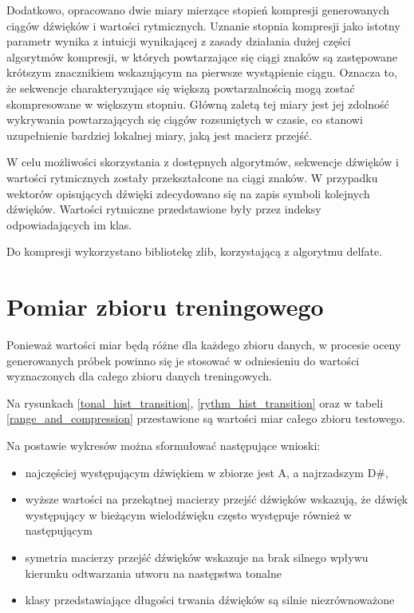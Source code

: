 {{        Dodatkowo, opracowano dwie miary mierzące stopień kompresji generowanych ciągów dźwięków i wartości rytmicznych. 
        Uznanie stopnia kompresji jako istotny parametr wynika z intuicji wynikającej z zasady działania dużej części
        algorytmów kompresji, w których powtarzające się ciągi znaków są zastępowane krótszym znacznikiem wskazującym na pierwsze 
        wystąpienie ciągu. 
        Oznacza to, że sekwencje charakteryzujące się większą powtarzalnością mogą zostać skompresowane w większym stopniu.
        Główną zaletą tej miary jest jej zdolność wykrywania powtarzających się ciągów rozsuniętych w czasie, co stanowi uzupełnienie 
        bardziej lokalnej miary, jaką jest macierz przejść.

        W celu możliwości skorzystania z dostępnych algorytmów, sekwencje dźwięków i wartości rytmicznych zostały przekształcone
        na ciągi znaków. W przypadku wektorów opisujących dźwięki zdecydowano się na zapis symboli kolejnych dźwięków. Wartości
        rytmiczne przedstawione były przez indeksy odpowiadających im klas. 

        Do kompresji wykorzystano bibliotekę zlib, korzystającą z algorytmu delfate.
    }

        \newpage

    \section{Pomiar zbioru treningowego}
    {
        Ponieważ wartości miar będą różne dla każdego zbioru danych, w procesie oceny generowanych próbek powinno się je 
        stosować w odniesieniu do wartości wyznaczonych dla całego zbioru danych treningowych. 
        
        Na rysunkach \ref{tonal_hist_transition}, \ref{rythm_hist_transition} oraz w tabeli \ref{range_and_compression} 
        przestawione są wartości miar całego zbioru testowego.

        

        

        

        \pagebreak

        Na postawie wykresów można sformułować następujące wnioski:
        \begin{itemize}
            \setlength\itemsep{-0.5em}
            \item najczęściej występującym dźwiękiem w zbiorze jest A, a najrzadszym D\#,
            \item wyższe wartości na przekątnej macierzy przejść dźwięków wskazują, że dźwięk występujący w bieżącym wielodźwięku
            często występuje również w następującym
            \item symetria macierzy przejść dźwięków wskazuje na brak silnego wpływu kierunku odtwarzania utworu na następstwa tonalne
            \item klasy przedstawiające długości trwania dźwięków są silnie niezrównoważone
        \end{itemize}

}}
